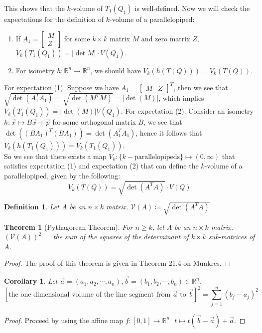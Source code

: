 \documentclass[11pt,oneside]{book}
\theoremstyle{break}
\theoremstyle{break}
\newtheorem{thm}{Theorem}[section]
\newtheorem{corT}[lem]{Corollary}
\newtheorem{defn}{Definition}[corL]
\newcommand{\R}{\mathbb{R}}
\newcommand{\bmat}[1]{\begin{bmatrix} #1 \end{bmatrix}}
\begin{document}
This shows that the $k$-volume of $T_1(Q_1)$ is well-defined. Now we will check the expectations for the definition of $k$-volume of a parallelopiped:
\begin{enumerate}[topsep=3pt,itemsep=-1ex,partopsep=1ex,parsep=1ex]
\item If $A_1 = \bmat{M \\ Z}$ for some $k\times k$ matrix $M$ and zero matrix $Z$, $V_k(T_1(Q_1))= |\det M|\cdot V(Q_1)$.
\item For isometry $h:\R^n \to \R^n$, we should have $V_k(h(T(Q))) = V_k(T(Q))$.
\end{enumerate}
For expectation (1). Suppose we have $A_1 = \bmat{M&Z}^T$, then we see that $\sqrt{\det(A_1^TA_1)} = \sqrt{\det(M^TM)} = |\det(M)|$, which implies $V_k(T_1(Q_1)) = |\det(M)| V(Q_1)$. For  expectation (2). Consider an isometry $h:\vec{x}\mapsto B\vec{x}+\vec{p}$ for some orthogonal matrix $B$, we see that $\det((BA_1)^T(BA_1)) = \det(A_1^TA_1)$, hence it follows that $V_k(h(T_1(Q_1))) = V_k(T_1(Q_1))$.\\

So we see that there exists a map 
$V_k: \{k-\text{parallelopipeds}\}\mapsto (0,\infty)$ that satisfies expectation (1) and expectation (2) that can define the $k$-volume of a parallelopiped, given by the following:
$$V_k(T(Q)) = \sqrt{\det(A^TA)}\cdot V(Q)$$

\begin{defn}
Let $A$ be an $n \times k$ matrix. $\mathcal{V}(A) \coloneqq \sqrt{\det(A^TA)}$
\end{defn}

\begin{thm}[Pythagorean Theorem]
For $n\geq k$, let $A$ be an $n \times k$ matrix. \\
$(\mathcal{V}(A))^2=$ the sum of the squares of the determinant of $k \times k$ sub-matrices of $A$. 
\end{thm}
\begin{proof}
The proof of this theorem is given in Theorem 21.4 on Munkres.
\end{proof}

\begin{corT}
Let $\vec{a}=(a_1,a_2,\cdots,a_n),\vec{b}=(b_1,b_2,\cdots,b_n)\in \R^n$. \\$$\left[\text{the one dimensional volume of the line segment from }\vec{a}\text{ to }\vec{b}\right]^2 = \sum_{j=1}^n (b_j - a_j)^2$$
\end{corT}
\begin{proof}
Proceed by using the affine map $f:[0,1] \to \R^n \ \ \ t\mapsto t(\vec{b}-\vec{a})+\vec{a}$. 
\end{proof}
\end{document}

